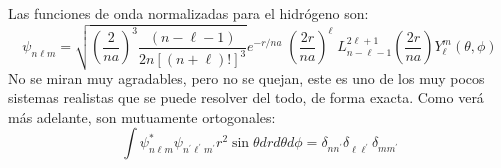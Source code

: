 Las funciones de onda normalizadas para el hidrógeno son:
\begin{equation}
\boxed{\psi_{n \ell m} = \sqrt{\left(\dfrac{2}{na} \right)^{3} \dfrac{(n - \ell - 1)}{2n[(n + \ell)!]^{3}}} e^{-r/na} \; \left( \dfrac{2r}{na} \right)^{\ell} \; L_{n - \ell -1}^{2 \ell + 1} \left( \dfrac{2 r}{n a} \right) Y_{\ell}^{m} (\theta, \phi)}
\label{eq:ecuacion_04_89}
\end{equation}
No se miran muy agradables, pero no se quejan, este es uno de los muy pocos sistemas realistas que se puede resolver del todo, de forma exacta. Como verá más adelante, son mutuamente ortogonales:
\begin{equation}
\int \psi_{n \ell m}^{*} \psi_{n^{\prime} \ell^{\prime} m^{\prime}} r^{2} \sin \theta dr d \theta d \phi =  \delta_{n n^{\prime}} \delta_{\ell \ell^{\prime}} \delta_{m m^{\prime}}
\label{eq:ecuacion_04_90}
\end{equation}
